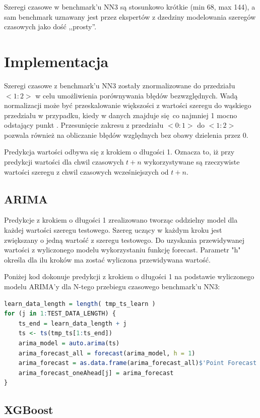 \documentclass[11pt]{report}
\begin{document}
Szeregi czasowe w benchmark'u NN3 są stosunkowo krótkie (min 68, max 144), a sam benchmark uznawany jest przez ekspertów z dzedziny modelowania szeregów czasowych jako dość ,,prosty''.

\section{Implementacja}

Szeregi czasowe z benchmark'u NN3 zostały znormalizowane do przedziału $<1:2>$ w celu umożliwienia porównywania błędów bezwzględnych.
Wadą normalizacji może być przeskalowanie większości z wartości szeregu do wąskiego przedziału w przypadku, kiedy w danych znajduje się co najmniej 1 mocno odstający punkt \cite{noauthor_standardization_nodate}.
Przesunięcie zakresu z przedziału $<0:1>$ do $<1:2>$ pozwala również na obliczanie błędów względnych bez obawy dzielenia przez 0.

Predykcja wartości odbywa się z krokiem o długości 1.
Oznacza to, iż przy predykcji wartości dla chwil czasowych $t+n$ wykorzystywane są rzeczywiste wartości szeregu z chwil czasowych wcześniejszych od $t+n$.

\subsection{ARIMA}
Predykcje z krokiem o długości 1 zrealizowano tworząc oddzielny model dla każdej wartości szeregu testowego. Szereg uczący w każdym kroku jest zwiększany o jedną wartość z szeregu testowego.
Do uzyskania przewidywanej wartości z wyliczonego modelu wykorzystaniu funkcję forecast. Parametr "h" określa dla ilu kroków ma zostać wyliczona przewidywana wartość.

Poniżej kod dokonuje predykcji z krokiem o długości 1 na podstawie wyliczonego modelu ARIMA'y dla N-tego przebiegu czasowego benchmark'u NN3:
\begin{lstlisting}[language=R]
learn_data_length = length( tmp_ts_learn )
for (j in 1:TEST_DATA_LENGTH) {
    ts_end = learn_data_length + j
    ts <- ts(tmp_ts[1:ts_end])
    arima_model = auto.arima(ts)
    arima_forecast_all = forecast(arima_model, h = 1)
    arima_forecast = as.data.frame(arima_forecast_all)$'Point Forecast'
    arima_forecast_oneAhead[j] = arima_forecast
}
\end{lstlisting}

\subsection{XGBoost}
\end{document}

